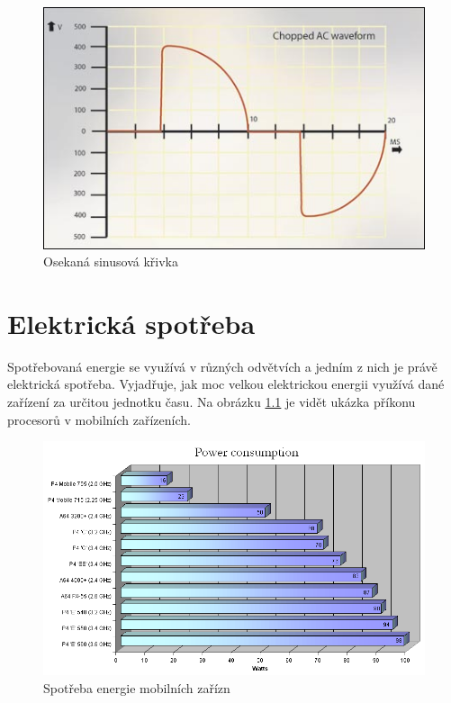 \documentclass[FM,RP]{tulthesis}
\begin{document}
  
\begin{figure}[h]
	\begin{center}
		\includegraphics[scale=0.7]{chopped_ac_waveform.jpg}
		\caption{Osekaná sinusová křivka}
		\label{osekanakrivka}
	\end{center}
\end{figure}

 \chapter{Elektrická spotřeba}
   Spotřebovaná energie se využívá v různých odvětvích a jedním z nich je právě elektrická spotřeba. Vyjadřuje, jak moc velkou elektrickou energii využívá dané zařízení za určitou jednotku času. Na obrázku \ref{spotrebaenergie} je vidět ukázka příkonu procesorů v mobilních zařízeních.
   \cite{wiki:Electric_energy_consumption}
   \begin{figure}[h]
   	\begin{center}
   		\includegraphics[scale=0.5]{Power_consumption_graph.jpg}
   		\caption{Spotřeba energie mobilních zařízn}
   		\label{spotrebaenergie}
   		\end{center}
   \end{figure}
\end{document}
